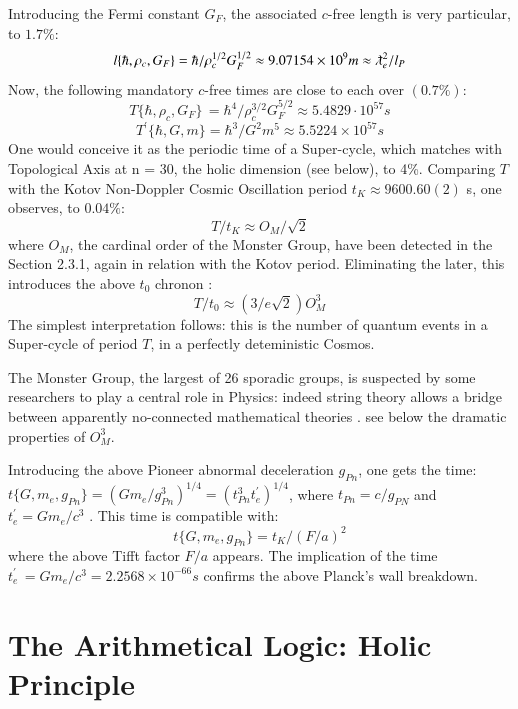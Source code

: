 \documentclass[twoside,draft]{article}
\begin{document}
\begin{sloppypar}
Introducing the Fermi constant $G_{F}$, the associated $c$-free length is very particular, to $1.7\%$:
$$l\{\hbar,\rho_{c},G_{F}\} = \hbar/\rho_{c}^{1/2} G_{F}^{1/2} \approx 9.07154 \times 10^{9} m \approx \lambdabar_{e}^{2}/l_{P}$$
Now, the following mandatory $c$-free times are close to each over $(0.7\%)$:
\begin{equation}
T\{\hbar,\rho_{c} ,G_{F} \}\, = \hbar^{4} /\rho_{c}^{3/2} G_{F}^{5/2} \approx 5.4829 \cdot 10^{57} s
\end{equation}
\begin{equation}
T^{\prime}\{\hbar,G,m\} = \hbar^{3} /G^{2} m^{5} \approx 5.5224 \times 10^{57} s
\end{equation}
One would conceive it as the periodic time of a Super-cycle, which matches with Topological Axis at n = 30,
the holic dimension (see below), to 4\%. Comparing $T$ with the Kotov Non-Doppler Cosmic
Oscillation period $t_{K} \approx 9600.60(2)$ s, one observes, to $0.04\%$:
$$T/t_{K} \approx O_{M} /\sqrt{2}$$
where $O_{M}$, the cardinal order of the Monster Group, have been detected in the Section 2.3.1, again in relation with the Kotov period. Eliminating the later, this introduces the above $t_0$ chronon :
\begin{equation}
T/t_0 \approx (3/e\sqrt{2})O_M^3
\end{equation}
The simplest interpretation follows: this is the number of quantum events in a Super-cycle of period $T$, in a perfectly deteministic Cosmos. 

The  Monster  Group,  the largest of 26 sporadic groups, is suspected by some researchers to play a central role in Physics: indeed string theory allows a bridge between apparently no-connected mathematical theories \cite{Borcherds}. see below the dramatic properties of $O_M^3$.

Introducing the above Pioneer abnormal deceleration $g_{Pn}$, one gets the time: 
$
t\{G, m_{e} , g_{Pn} \} = (Gm_{e} /g_{Pn}^{3} )^{1/4} = (t_{Pn}^{3} t^{\prime}_{e} )^{1/4}
$, where $t_{Pn} = c/g_{PN}$ and $t^{\prime}_{e} = Gm_{e} /c^{3}$ . This time is compatible with:
\begin{equation}
t\{G, m_{e} , g_{Pn} \} = t_{K} /(F/a)^{2}
\end{equation}
where the above Tifft factor $F/a$ appears. The implication of the time 
$t^{\prime}_{e}\, = Gm_{e} /c^{3} = 2.2568 \times 10^{-66} s$
confirms the above Planck's wall breakdown.



\section{The Arithmetical Logic: Holic Principle}


\end{sloppypar}
\end{document}
